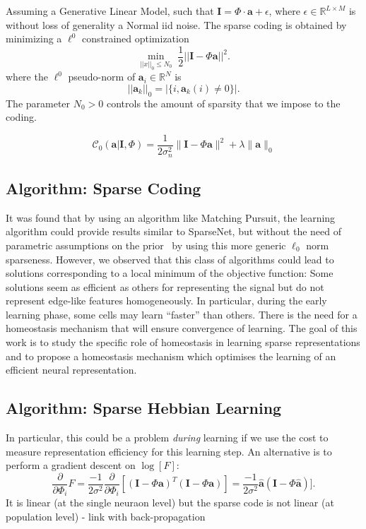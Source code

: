 \documentclass[a4paper, 11pt, draft]{article} %
\newcommand{\umin}[1]{\underset{#1}{\min}\;}
\newcommand{\enscond}[2]{\lbrace #1, #2 \rbrace}
\newcommand{\norm}[1]{|\!| #1 |\!|}
\newcommand{\abs}[1]{\left|#1\right|}
\newcommand{\RR}{\mathbb{R}}
\newcommand{\coef}{\mathbf{a}} %
\newcommand{\image}{\mathbf{I}} %
\newcommand{\dico}{\Phi} %
\begin{document}

Assuming a Generative Linear Model, such that $\image = \dico \cdot \coef + \epsilon $, where $\epsilon  \in \RR^{L \times M}$ is without loss of generality a Normal iid noise.  The sparse coding is obtained by minimizing a $\ell^0$ constrained optimization
$$ \umin{ \norm{x}_0 \leq N_0 } \frac{1}{2}\norm{\image - \dico \coef}^2 .  $$
where the $\ell^0$ pseudo-norm of $\coef_i \in \RR^N$ is
$$ \norm{\coef_k}_0 = \abs{\enscond{i}{\coef_k(i) \neq 0}}. $$
The parameter $N_0>0$ controls the amount of sparsity that we impose to the coding.

\begin{equation}%
\mathcal{C}_0( \coef | \image , \dico) = \frac{1}{2\sigma_n^2} \| \image - \dico \coef \|^2 + \lambda \| \coef \|_0 \nonumber%
\end{equation}%

\subsection{Algorithm: Sparse Coding}

It was found that by using an algorithm like Matching Pursuit, the learning algorithm could provide results similar to {\sc SparseNet}, but without the need of parametric assumptions on the prior~\citep{Perrinet10shl} by using this more generic $\ell_0$ norm sparseness. However, we observed that this class of algorithms could lead to solutions corresponding to a local minimum of the objective function: Some solutions seem as efficient as others for representing the signal but do not represent edge-like features homogeneously. In particular, during the early learning phase, some cells may learn ``faster'' than others. There is the need for a homeostasis mechanism that will ensure convergence of learning. The goal of this work is to study the specific role of homeostasis in learning sparse representations and to propose a homeostasis mechanism which optimises the learning of an efficient neural representation.%

\subsection{Algorithm: Sparse Hebbian Learning}

In particular, this could be a problem \emph{during} learning if we use the cost to measure representation efficiency for this learning step. An alternative is to 
perform a gradient descent on $\log[ F ] $:
$$ \frac{\partial }{\partial \dico_i } F = \frac{-1}{2 \sigma^2} \frac{\partial }{\partial \dico_i }[(\image - \dico \coef)^T (\image - \dico \coef)] = \frac{-1}{2 \sigma^2} \hat{\coef} (\image - \dico \hat{\coef})].$$
It is linear (at the single neuraon level) but the sparse code is not linear (at population level) - link with back-propagation
\end{document}
